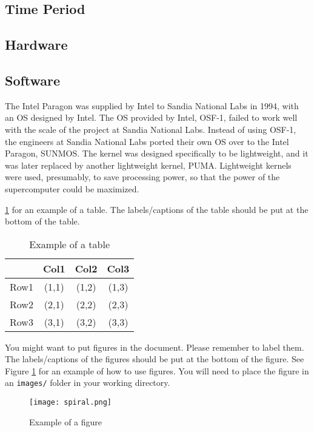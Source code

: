 \documentclass[letterpaper, 10 pt, conference]{IEEEconf}
\begin{document}
\subsection{Time Period}
\subsection{Hardware}
\subsection{Software}
The Intel Paragon was supplied by Intel to Sandia National Labs in
1994, with an OS designed by Intel. The OS provided by Intel,
OSF-1, failed to work well with the scale of the project at Sandia
National Labs. Instead of using OSF-1, the engineers at Sandia
National Labs ported their own OS over to the Intel Paragon,
SUNMOS. The kernel was designed specifically to be lightweight,
and it was later replaced by another lightweight kernel, PUMA.
Lightweight kernels were used, presumably, to save processing
power, so that the power of the supercomputer could be maximized.


\ref{tbl:example} for an example of a table.
The labels/captions of the table should be put at the bottom
of the table.


\begin{table}[h!]
\begin{center}
\begin{tabular}{||c | c | c | c||} 
\hline
  & Col1 & Col2 & Col3 \\ [0.5ex]
\hline\hline
Row1 & (1,1) & (1,2) & (1,3) \\ 
\hline
Row2 & (2,1) & (2,2) & (2,3) \\
\hline
Row3 & (3,1) & (3,2) & (3,3) \\
\hline
\end{tabular}
\caption{Example of a table}
\label{tbl:example}
\end{center}
\end{table}

You might want to put figures in the document. Please
remember to label them. The labels/captions of the figures
should be put at the bottom of the figure. See Figure
\ref{fig:example} for an example of how to use figures.
You will need to place the figure in an \texttt{images/} folder
in your working directory.

\begin{figure}[h!]
\centering
\texttt{[image: spiral.png]}
\caption{Example of a figure}
\label{fig:example}
\end{figure} 
\end{document}
